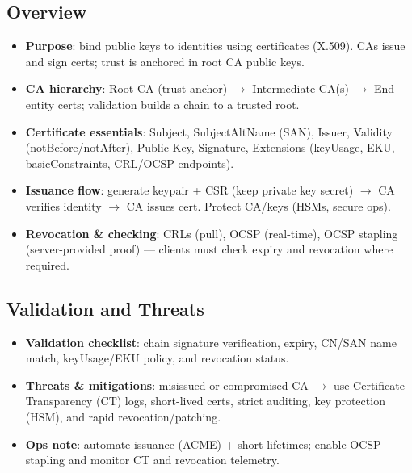 \documentclass[11pt]{article}
\begin{document}
\subsection{Overview}
\begin{itemize}
  \item \textbf{Purpose}: bind public keys to identities using certificates (X.509). CAs issue and sign certs; trust is anchored in root CA public keys.
  
  \item \textbf{CA hierarchy}: Root CA (trust anchor) $\rightarrow$ Intermediate CA(s) $\rightarrow$ End-entity certs; validation builds a chain to a trusted root.
  
  \item \textbf{Certificate essentials}: Subject, SubjectAltName (SAN), Issuer, Validity (notBefore/notAfter), Public Key, Signature, Extensions (keyUsage, EKU, basicConstraints, CRL/OCSP endpoints).
  
  \item \textbf{Issuance flow}: generate keypair + CSR (keep private key secret) $\rightarrow$ CA verifies identity $\rightarrow$ CA issues cert. Protect CA/keys (HSMs, secure ops).
  
  \item \textbf{Revocation \& checking}: CRLs (pull), OCSP (real-time), OCSP stapling (server-provided proof) --- clients must check expiry and revocation where required.
\end{itemize}

\subsection{Validation and Threats}
\begin{itemize}
  \item \textbf{Validation checklist}: chain signature verification, expiry, CN/SAN name match, keyUsage/EKU policy, and revocation status.
  
  \item \textbf{Threats \& mitigations}: misissued or compromised CA $\rightarrow$ use Certificate Transparency (CT) logs, short-lived certs, strict auditing, key protection (HSM), and rapid revocation/patching.
  
  \item \textbf{Ops note}: automate issuance (ACME) + short lifetimes; enable OCSP stapling and monitor CT and revocation telemetry.
\end{itemize}

\clearpage
\printindex
\end{document}
